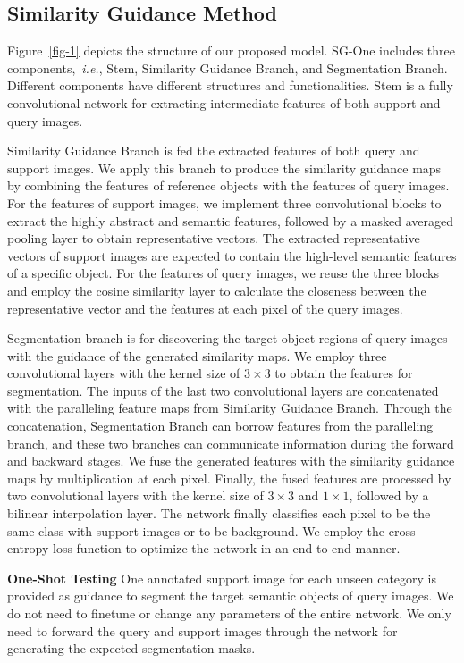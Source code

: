 \documentclass[journal]{IEEEtran}
\newcommand{\ie}{\emph{i.e.}}
\begin{document}
\subsection{Similarity Guidance Method}

Figure~\ref{fig-1} depicts the structure of our proposed model.
SG-One includes three components,~\ie, Stem, Similarity Guidance Branch, and Segmentation Branch.
Different components have different structures and functionalities.
Stem is a fully convolutional network for extracting intermediate features of both support and query images. 

Similarity Guidance Branch is fed the extracted features of both query and support images.
We apply this branch to produce the similarity guidance maps by combining the features of reference objects with the features of query images.
For the features of support images, we implement three convolutional blocks to extract the highly abstract and semantic features, followed by a masked averaged pooling layer to obtain representative vectors.
The extracted representative vectors of support images are expected to contain the high-level semantic features of a specific object. 
For the features of query images, we reuse the three blocks and employ the cosine similarity layer to calculate the closeness between the representative vector and the features at each pixel of the query images.  

Segmentation branch is for discovering the target object regions of query images with the guidance of the generated similarity maps.
We employ three convolutional layers with the kernel size of $3 \times 3$ to obtain the features for segmentation.
The inputs of the last two convolutional layers are concatenated with the paralleling feature maps from Similarity Guidance Branch.
Through the concatenation, Segmentation Branch can borrow features from the paralleling branch, and these two branches can communicate information during the forward and backward stages.
We fuse the generated features with the similarity guidance maps by multiplication at each pixel. 
Finally, the fused features are processed by two convolutional layers with the kernel size of $3 \times 3$ and $1 \times 1$, followed by a bilinear interpolation layer.
The network finally classifies each pixel to be the same class with support images or to be background.
We employ the cross-entropy loss function to optimize the network in an end-to-end manner.

\noindent \textbf{One-Shot Testing}
One annotated support image for each unseen category is provided as guidance to segment the target semantic objects of query images.
We do not need to finetune or change any parameters of the entire network.
We only need to forward the query and support images through the network for generating the expected segmentation masks.
\end{document}
